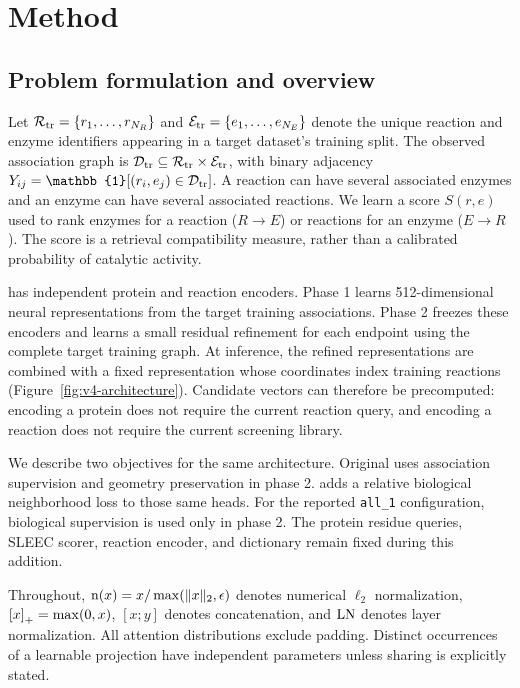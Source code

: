 \section{Method}
\label{sec:v4-method}

\subsection{Problem formulation and overview}
\label{sec:v4-problem}
Let $\mathcal{R}_{\mathrm{tr}}=\{r_1,\ldots,r_{N_R}\}$ and
$\mathcal{E}_{\mathrm{tr}}=\{e_1,\ldots,e_{N_E}\}$ denote the unique reaction and enzyme
identifiers appearing in a target dataset's training split. The observed
association graph is $\mathcal{D}_{\mathrm{tr}}\subseteq\mathcal{R}_{\mathrm{tr}}\times\mathcal{E}_{\mathrm{tr}}$, with binary adjacency
$Y_{ij}=\mathbb{1}[(r_i,e_j)\in\vD]$. A reaction can have several associated
enzymes and an enzyme can have several associated reactions. We learn a score
$S(r,e)$ used to rank enzymes for a reaction ($R\!\to\!E$) or reactions for an
enzyme ($E\!\to\!R$). The score is a retrieval compatibility measure, rather
than a calibrated probability of catalytic activity.

\methodname has independent protein and reaction encoders. Phase 1 learns
512-dimensional neural representations from the target training associations.
Phase 2 freezes these encoders and learns a small residual refinement for each
endpoint using the complete target training graph. At inference, the refined
representations are combined with a fixed representation whose coordinates
index training reactions (Figure~\ref{fig:v4-architecture}). Candidate vectors
can therefore be precomputed: encoding a protein does not require the current
reaction query, and encoding a reaction does not require the current screening
library.

We describe two objectives for the same architecture. Original \methodname
uses association supervision and geometry preservation in phase 2.
\vfourBio adds a relative biological neighborhood loss to those same heads.
For the reported \texttt{all\_1} configuration, biological supervision is used
only in phase 2. The protein residue queries, SLEEC scorer, reaction encoder,
and dictionary remain fixed during this addition.

Throughout, $\operatorname{n}(x)=x/\max(\lVert x\rVert_2,\epsilon)$ denotes numerical
$\ell_2$ normalization, $\left[x\right]_{+}=\max(0,x)$, $[x;y]$ denotes concatenation,
and $\operatorname{LN}$ denotes layer normalization. All attention distributions exclude
padding. Distinct occurrences of a learnable projection have independent
parameters unless sharing is explicitly stated.

